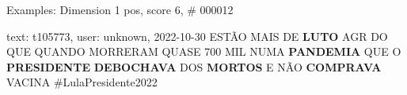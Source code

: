 \begin{frame}{Examples: Dimension 1 pos, score 6, \# 000012}
\footnotesize
\begin{exampleblock}{text: t105773, user: unknown, 2022-10-30}
ESTÃO MAIS DE \textbf{LUTO} AGR DO QUE QUANDO MORRERAM QUASE 700 MIL NUMA 
\textbf{PANDEMIA} QUE O \textbf{PRESIDENTE} \textbf{DEBOCHAVA} DOS 
\textbf{MORTOS} E NÃO \textbf{COMPRAVA} VACINA \#LulaPresidente2022 
\end{exampleblock}
\end{frame}
